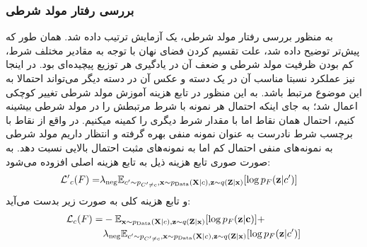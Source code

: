 \subsubsection{بررسی رفتار مولد شرطی}
به منظور بررسی رفتار مولد شرطی، یک آزمایش ترتیب داده شد. همان طور که پیش‌تر توضیح داده شد، علت تقسیم کردن فضای نهان با توجه به مقادیر مختلف شرط، کم بودن ظرفیت مولد شرطی و ضعف آن در یادگیری هر توزیع پیچیده‌ای بود. در اینجا نیز عملکرد نسبتا مناسب آن در یک دسته و عکس آن در دسته دیگر می‌تواند احتمالا به این موضوع مرتبط باشد. به این منظور در تابع هزینه آموزش مولد شرطی تغییر کوچکی اعمال شد؛ به جای اینکه احتمال هر نمونه با شرط مرتبطش را در مولد شرطی بیشینه کنیم، احتمال همان نقاط اما با مقدار شرط دیگری را کمینه میکنیم. در واقع از نقاط با برچسب شرط نادرست به عنوان نمونه منفی بهره گرفته و انتظار داریم مولد شرطی به نمونه‌های منفی احتمال کم اما به نمونه‌های مثبت احتمال بالایی نسبت دهد. به صورت صوری تابع هزینه ذیل به تابع هزینه اصلی افزوده می‌شود:
\begin{align}
	\mathcal{L'}_c (F) = & \lambda_\text{neg} \mathbb E_{c' \sim p_{C'\neq c}, {\bf x} \sim p_\text{Data}({\bf X}|c), {\bf z} \sim q({\bf Z}|{\bf x})} [\log p_F({\bf z}|c')]
\end{align}
و تابع هزینه کلی به صورت زیر بدست می‌آید:
\begin{align}
	\mathcal{L}_c (F) = & - \mathbb E_{{\bf x} \sim p_\text{Data}({\bf X}|c), {\bf z} \sim q({\bf Z}|{\bf x})} [\log p_F({\bf z}|{\bf c})] +                                       \\
	                    & \lambda_\text{neg} \mathbb E_{c' \sim p_{C'\neq c}, {\bf x} \sim p_\text{Data}({\bf X}|c), {\bf z} \sim q({\bf Z}|{\bf x})} [\log p_F({\bf z}|c')]
\end{align}
